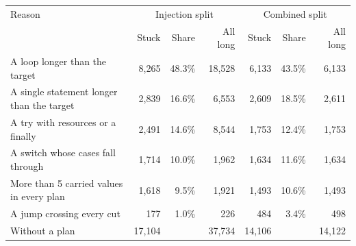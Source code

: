 \begin{tabular}{>{\raggedright\arraybackslash}p{5.4cm}rrrrrr}
\toprule
Reason & \multicolumn{3}{c}{Injection split} & \multicolumn{3}{c}{Combined split} \\
 & Stuck & Share & All long & Stuck & Share & All long \\
\midrule
A loop longer than the target & 8{,}265 & 48.3\% & 18{,}528 & 6{,}133 & 43.5\% & 6{,}133 \\
A single statement longer than the target & 2{,}839 & 16.6\% & 6{,}553 & 2{,}609 & 18.5\% & 2{,}611 \\
A try with resources or a finally & 2{,}491 & 14.6\% & 8{,}544 & 1{,}753 & 12.4\% & 1{,}753 \\
A switch whose cases fall through & 1{,}714 & 10.0\% & 1{,}962 & 1{,}634 & 11.6\% & 1{,}634 \\
More than 5 carried values in every plan & 1{,}618 & 9.5\% & 1{,}921 & 1{,}493 & 10.6\% & 1{,}493 \\
A jump crossing every cut & 177 & 1.0\% & 226 & 484 & 3.4\% & 498 \\
\midrule
Without a plan & 17{,}104 & & 37{,}734 & 14{,}106 & & 14{,}122 \\
\bottomrule
\end{tabular}
